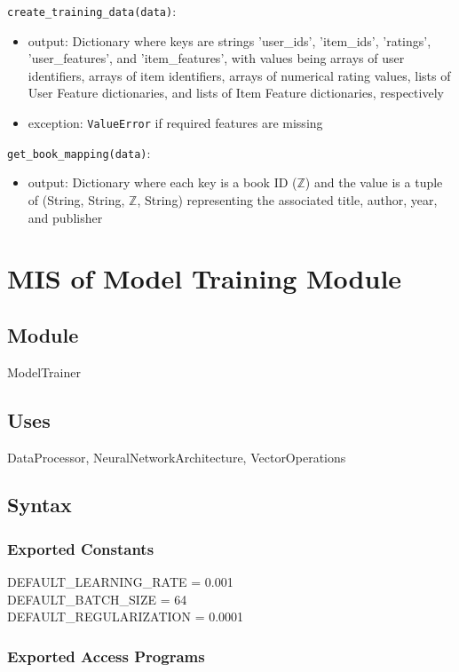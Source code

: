 \documentclass[12pt, titlepage]{article}
\begin{document}
\noindent \texttt{create\_training\_data(data)}:
\begin{itemize}
\item output: Dictionary where keys are strings 'user\_ids', 'item\_ids', 'ratings', 'user\_features', and 'item\_features', with values being arrays of user identifiers, arrays of item identifiers, arrays of numerical rating values, lists of User Feature dictionaries, and lists of Item Feature dictionaries, respectively
\item exception: \texttt{ValueError} if required features are missing
\end{itemize}

\noindent \texttt{get\_book\_mapping(data)}:
\begin{itemize}
\item output: Dictionary where each key is a book ID ($\mathbb{Z}$) and the value is a tuple of (String, String, $\mathbb{Z}$, String) representing the associated title, author, year, and publisher
\end{itemize}

\newpage

\section{MIS of Model Training Module} \label{ModuleMT}

\subsection{Module}

ModelTrainer

\subsection{Uses}
DataProcessor, NeuralNetworkArchitecture, VectorOperations

\subsection{Syntax}

\subsubsection{Exported Constants}
DEFAULT\_LEARNING\_RATE = 0.001\\
DEFAULT\_BATCH\_SIZE = 64\\
DEFAULT\_REGULARIZATION = 0.0001
\subsubsection{Exported Access Programs}
\end{document}
